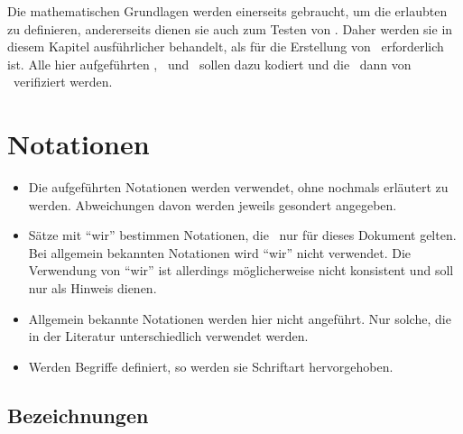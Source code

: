 Die mathematischen Grundlagen werden einerseits gebraucht, um die erlaubten \Beweisschritte{} zu definieren, andererseits dienen sie auch zum Testen von \ASBA.
Daher werden sie in diesem Kapitel ausführlicher behandelt, als für die Erstellung von \ASBA\ erforderlich ist.
Alle hier aufgeführten \Axiome, \Saetze\ und \Beweise\ sollen dazu kodiert und die \Beweise\ dann von \ASBA\ verifiziert werden.

\section{Notationen}%
\label{sec:Notationen}

\begin{itemize}
	\item Die  aufgeführten Notationen werden  verwendet, ohne nochmals erläutert zu werden. Abweichungen davon werden jeweils gesondert angegeben.
	\item Sätze mit \enquote{wir} bestimmen Notationen, die \textevtl\ nur für dieses Dokument gelten.
	Bei allgemein bekannten Notationen wird \enquote{wir} nicht verwendet.
	Die Verwendung von \enquote{wir} ist allerdings möglicherweise nicht konsistent und soll nur als Hinweis dienen.
	\item Allgemein bekannte Notationen werden hier nicht angeführt.
	Nur solche, die in der Literatur unterschiedlich verwendet werden.
	\item Werden Begriffe definiert, so werden sie  Schriftart hervorgehoben.
\end{itemize}

\subsection{Bezeichnungen}%
\label{sub:Bezeichnungen}

